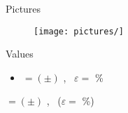 Pictures
\begin{figure}[H]
    \centering
    \texttt{[image: pictures/]} %
    \caption{}
    \label{}
\end{figure}


Values
\begin{itemize}
    \item $ = \left( \pm  \right)$ , \ $\varepsilon = $ \% 
\end{itemize}

$ = \left( \pm  \right)$ , \ ($\varepsilon = $ \%)